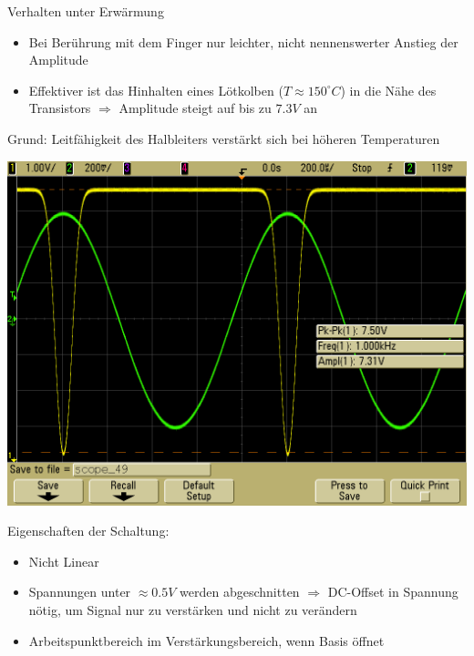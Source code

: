 \documentclass[compress,11pt]{beamer}
\begin{document}
\begin{frame}
\begin{block}{Verhalten unter Erwärmung}
\begin{itemize}
\item Bei Berührung mit dem Finger nur leichter, nicht nennenswerter Anstieg der Amplitude
\item Effektiver ist das Hinhalten eines Lötkolben ($T \approx 150 ^{\circ} C$) in die Nähe des Transistors  $\Rightarrow$ Amplitude steigt auf bis zu $7.3 V$ an
\end{itemize}
Grund: Leitfähigkeit des Halbleiters verstärkt sich bei höheren Temperaturen
\end{block}
\end{frame}
\begin{frame}
\includegraphics[width=.7\textwidth]{../daten/oszi/scope_49}
\end{frame}
\begin{frame}
Eigenschaften der Schaltung:\\
\begin{itemize}
\item Nicht Linear
\item Spannungen unter $\approx 0.5 V$ werden abgeschnitten $\Rightarrow$ DC-Offset in Spannung nötig, um Signal nur zu verstärken und nicht zu verändern
\item Arbeitspunktbereich im Verstärkungsbereich, wenn Basis öffnet
\end{itemize}
\end{frame}
\end{document}
